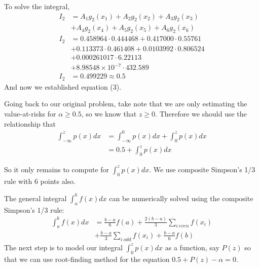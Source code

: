 \documentclass[10pt, twocolumn]{article}
\begin{document}
		To solve the integral,
		$$\begin{aligned}
			I_2 &= A_1g_2(x_1) + A_2g_2(x_2) + A_3g_2(x_3)\\
				&+ A_4g_2(x_4) + A_5g_2(x_5) + A_6g_2(x_6)\\
			I_2 &= 0.458964\cdot0.444468 + 0.417000\cdot0.55761\\
				&+ 0.113373\cdot0.461408 + 0.0103992\cdot0.806524\\
				&+ 0.000261017\cdot6.22113\\
				&+ 8.98548\times10^{-7}\cdot432.589\\
			I_2 &= 0.499229 \approx 0.5
		\end{aligned}$$
		And now we established equation (3).
		
		Going back to our original problem, take note that we are only estimating the value-at-risks for $\alpha\geq0.5$, so we know that $z\geq0$.
		Therefore we should use the relationship that
		$$\begin{aligned}
			\int_{-\infty}^{z}p(x)dx &= \int_{-\infty}^{0}p(x)dx + \int_{0}^{z}p(x)dx\\
				&= 0.5 + \int_{0}^{z}p(x)dx
		\end{aligned}$$
		
		So it only remains to compute for $\int_{0}^{z}p(x)dx$.
		We use composite Simpson's 1/3 rule with 6 points also.
		
		The general integral $\int_{a}^{b}f(x)dx$ can be numerically solved using the composite Simpson's 1/3 rule:
		\begin{equation}
		\begin{aligned}
			\int_{a}^{b}f(x)dx &= \frac{b-a}{6}f(a) + \frac{2(b-a)}{3}\sum_{i\:even}f(x_i)\\
			&+ \frac{b-a}{3}\sum_{i\:odd}f(x_i) + \frac{b-a}{6}f(b)
		\end{aligned}
		\end{equation}
		The next step is to model our integral $\int_{0}^{z}p(x)dx$ as a function, say $P(z)$ so that we can use root-finding method for the equation $0.5 + P(z)-\alpha=0$.
		
\end{document}
